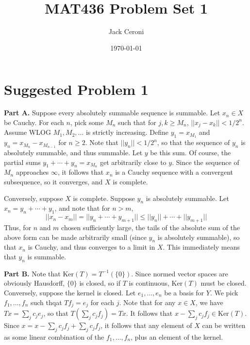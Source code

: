 \documentclass[aps,pra,showpacs,notitlepage,onecolumn,superscriptaddress,nofootinbib]{revtex4-1}
\theoremstyle{definition}
\begin{document}
\title{MAT436 Problem Set 1}
\author{Jack Ceroni}
\date{\today}

\maketitle

\section{Suggested Problem 1}

\noindent \textbf{Part A.} Suppose every absolutely summable sequence is summable. Let $x_n \in X$ be Cauchy. For each $n$, pick some $M_n$
such that for $j, k \geq M_n$, $||x_j - x_k|| < 1/2^n$. Assume WLOG $M_1, M_2, \dots$ is strictly increasing. Define $y_1 = x_{M_{1}}$ and $y_n = x_{M_{n}} - x_{M_{n-1}}$ for $n \geq 2$. Note that $||y_n|| < 1/2^n$,
so that the sequence of $y_n$ is absolutely summable, and thus summable. Let $y$ be this sum. Of course, the partial sums $y_1 + \cdots + y_n = x_{M_{n}}$ get arbitrarily close to $y$. Since the sequence of $M_n$
approaches $\infty$, it follows that $x_n$ is a Cauchy sequence with a convergent subsequence, so it converges, and $X$ is complete.

Conversely, suppose $X$ is complete. Suppose $y_n$ is absolutely summable. Let $x_n = y_n + \cdots + y_1$, and note that for $n > m$,
\begin{equation}
  ||x_n - x_m|| = ||y_n + \cdots + y_{m+1}|| \leq ||y_n|| + \cdots + ||y_{m+1}||
\end{equation}
Thus, for $n$ and $m$ chosen sufficiently large, the tails of the absolute sum of the above form can be made arbitrarily small (since $y_n$ is absolutely summable),
so that $x_n$ is Cauchy, and thus converges to a limit in $X$. This immediately means that $y_n$ is summable.
\newline

\noindent \textbf{Part B.} Note that $\text{Ker}(T) = T^{-1}(\{0\})$. Since normed vector spaces are obviously Hausdorff, $\{0\}$ is closed, so if $T$ is continuous, $\text{Ker}(T)$ must be closed.
Conversely, suppose the kernel is closed. Let $e_1, \dots, e_n$ be a basis for $Y$. We pick $f_1, \dots, f_n$ such thqat $T f_j = e_j$ for each $j$. Note that for any $x \in X$, we have $Tx = \sum_{j} c_j e_j$,
so that $T\left( \sum_j c_j f_j \right) = Tx$. It follows that $x - \sum_j c_j f_j \in \text{Ker}(T)$. Since $x = x - \sum_{j} c_j f_j + \sum_j c_j f_j$, it follows that any element of $X$ can
be written as some linear combination of the $f_1, \dots, f_n$, plus an element of the kernel.
\end{document}
